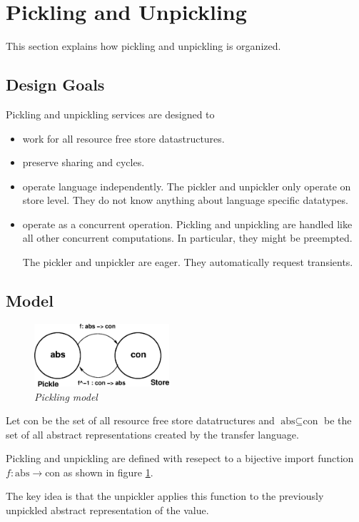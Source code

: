 \section{Pickling and Unpickling}
This section explains how pickling and unpickling is organized.
\subsection{Design Goals}
Pickling and unpickling services are designed to
\begin{itemize}
\item work for all resource free store datastructures.
\item preserve sharing and cycles.
\item operate language independently.
The pickler and unpickler only operate on store level.
They do not know anything about language specific datatypes.
\item operate as a concurrent operation.
Pickling and unpickling are handled like all other concurrent computations.
In particular, they might be preempted.

The pickler and unpickler are eager.
They automatically request transients.
\end{itemize}
\subsection{Model}
\begin{figure}[ht]
\centering
\includegraphics[width=5cm]{figures/pickler_model.eps}
\caption{\label{model_pickler} {\it Pickling model}}
\end{figure}
Let $\text{con}$ be the set of all resource free store datatructures
and $\text{abs} \subseteq \text{con}$
be the set of all abstract representations created by the transfer language.

Pickling and unpickling are
defined with resepect to a bijective import function
$f : \text{abs} \rightarrow \text{con}$ as shown in figure \ref{model_pickler}.

The key idea is that the unpickler applies this function to the
previously unpickled abstract representation of the value.

